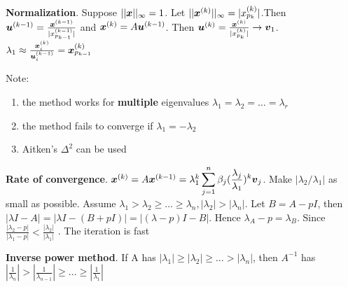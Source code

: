 \documentclass[11pt]{article}
\begin{document}
\textbf{Normalization}. Suppose \(||\boldsymbol{x}||_\infty=1\). Let
\(||\boldsymbol{x}^{(k)}||_\infty=|x_{p_k}^{(k)}|\).Then \(\boldsymbol{u}^{(k-1)}=
   \frac{\boldsymbol{x}^{(k-1)}}{|x_{p_{k-1}}^{(k-1)}|}\) and
\(\boldsymbol{x}^{(k)}=A\boldsymbol{u}^{(k-1)}\).
Then \(\boldsymbol{u}^{(k)}= \frac{\boldsymbol{x}^{(k)}}{|x_{p_k}^{(k)}|}\to \boldsymbol{v}_1\).
\(\lambda_1\approx
   \frac{\boldsymbol{x}_i^{(k)}}{\boldsymbol{u}_i^{(k-1)}}=\boldsymbol{x}_{p_{k-1}}^{(k)}\)

Note:
\begin{enumerate}
\item the method works for \textbf{multiple} eigenvalues
\(\lambda_1=\lambda_2=\dots=\lambda_r\)
\item the method fails to converge if \(\lambda_1=-\lambda_2\)
\item Aitken's \(\Delta^2\) can be used
\end{enumerate}


\textbf{Rate of convergence}. \(\boldsymbol{x}^{(k)}=A\boldsymbol{x}^{(k-1)}=\lambda_1^k
   \displaystyle\sum_{j=1}^n\beta_j(\frac{\lambda_j}{\lambda_1})^k\boldsymbol{v}_j\).
Make \(|\lambda_2/\lambda_1|\) as small as possible.
Assume \(\lambda_1>\lambda_2\ge\dots\ge\lambda_n, |\lambda_2|>|\lambda_n|\).
Let \(B=A-pI\), then \(|\lambda I-A|=|\lambda I-(B+pI)|=|(\lambda-p)I-B|\).
Hence \(\lambda_A-p=\lambda_B\). Since  \(\frac{|\lambda_2-p|}{|\lambda_1-p|}<
   \frac{|\lambda_2|}{|\lambda_1|}\) . The iteration is fast


\textbf{Inverse power method}. If A has
\(|\lambda_1|\ge|\lambda_2|\ge\dots>|\lambda_n|\), then \(A^{-1}\) has
\(|\frac{1}{\lambda_n}|>| \frac{1}{\lambda_{n-1}}|\ge\dots\ge|
   \frac{1}{\lambda_1}|\) 
\end{document}
